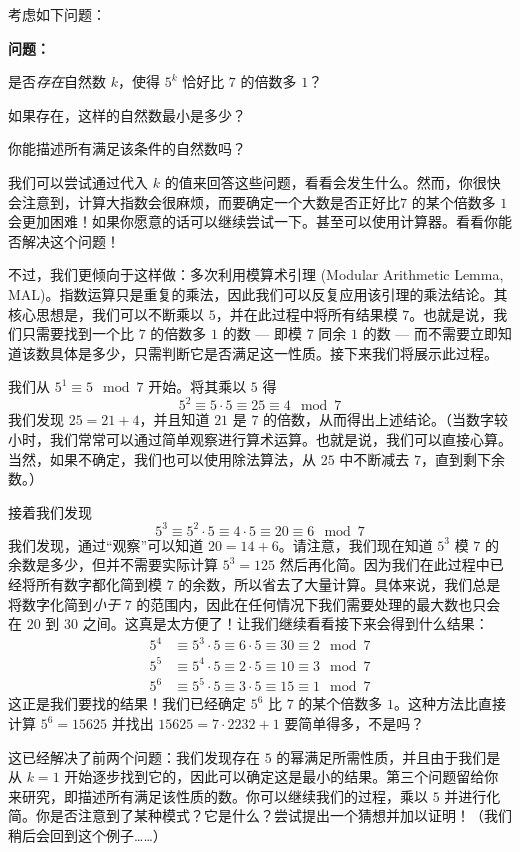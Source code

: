 \begin{example}
    考虑如下问题：
    \begin{center}
        \parbox{0.8\textwidth}{%
            \textbf{问题：}

            是否\emph{存在}自然数 $k$，使得 $5^k$ 恰好比 $7$ 的倍数多 $1$？

            如果存在，这样的自然数最小是多少？

            你能描述所有满足该条件的自然数吗？
        }
    \end{center}
    我们可以尝试通过代入 $k$ 的值来回答这些问题，看看会发生什么。然而，你很快会注意到，计算大指数会很麻烦，而要确定一个大数是否正好比$7$ 的某个倍数多 $1$ 会更加困难！如果你愿意的话可以继续尝试一下。甚至可以使用计算器。看看你能否解决这个问题！

    不过，我们更倾向于这样做：多次利用模算术引理 (Modular Arithmetic Lemma, MAL)。指数运算只是重复的乘法，因此我们可以反复应用该引理的乘法结论。其核心思想是，我们可以不断乘以 $5$，并在此过程中将所有结果模 $7$。也就是说，我们只需要找到一个比 $7$ 的倍数多 $1$ 的数 --- 即模 $7$ 同余 $1$ 的数 --- 而不需要立即知道该数具体是多少，只需判断它是否满足这一性质。接下来我们将展示此过程。

    我们从 $5^1 \equiv 5 \mod 7$ 开始。将其乘以 $5$ 得
    \[5^2 \equiv 5 \cdot 5 \equiv 25 \equiv 4 \mod 7\]
    我们发现 $25 = 21 + 4$，并且知道 $21$ 是 $7$ 的倍数，从而得出上述结论。（当数字较小时，我们常常可以通过简单观察进行算术运算。也就是说，我们可以直接心算。当然，如果不确定，我们也可以使用除法算法，从 $25$ 中不断减去 $7$，直到剩下余数。）

    接着我们发现
    \[5^3 \equiv 5^2 \cdot 5 \equiv 4 \cdot 5 \equiv 20 \equiv 6 \mod 7\]
    我们发现，通过``观察''可以知道 $20 = 14+6$。请注意，我们现在知道 $5^3$ 模 $7$ 的余数是多少，但并不需要实际计算 $5^3 = 125$ 然后再化简。因为我们在此过程中已经将所有数字都化简到模 $7$ 的余数，所以省去了大量计算。具体来说，我们总是将数字化简到\emph{小于} $7$ 的范围内，因此在任何情况下我们需要处理的最大数也只会在 $20$ 到 $30$ 之间。这真是太方便了！让我们继续看看接下来会得到什么结果：
    \begin{align*}
        5^4 &\equiv 5^3 \cdot 5 \equiv 6 \cdot 5 \equiv 30 \equiv 2 \mod 7 \\ 
        5^5 &\equiv 5^4 \cdot 5 \equiv 2 \cdot 5 \equiv 10 \equiv 3 \mod 7 \\
        5^6 &\equiv 5^5 \cdot 5 \equiv 3 \cdot 5 \equiv 15 \equiv 1 \mod 7 
    \end{align*}
    这正是我们要找的结果！我们已经确定 $5^6$ 比 $7$ 的某个倍数多 $1$。这种方法比直接计算 $5^6 = 15625$ 并找出 $15625 = 7 \cdot 2232 + 1$ 要简单得多，不是吗？

    这已经解决了前两个问题：我们发现存在 $5$ 的幂满足所需性质，并且由于我们是从 $k = 1$ 开始逐步找到它的，因此可以确定这是最小的结果。第三个问题留给你来研究，即描述所有满足该性质的数。你可以继续我们的过程，乘以 $5$ 并进行化简。你是否注意到了某种模式？它是什么？尝试提出一个猜想并加以证明！（我们稍后会回到这个例子……）
\end{example}

